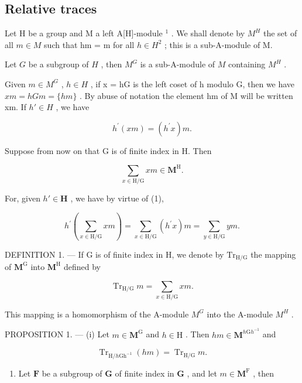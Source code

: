 \subsection{Relative traces}

Let H be a group and M a left A{[}H{]}-module \(^{1}\) . We shall denote by \(M^{H}\) the set of all \(m \in M\) such that hm = m for all \(h \in H^{2}\) ; this is a sub-A-module of M.

Let \(G\) be a subgroup of \(H\) , then \(M^G\) is a sub-A-module of \(M\) containing \(M^H\) .

Given \(m \in M^{G}\) , \(h \in H\) , if x = hG is the left coset of h modulo G, then we have \(xm = hGm = \{hm\}\) . By abuse of notation the element hm of M will be written xm. If \(h' \in H\) , we have

\[
h ^ {\prime} (x m) = \left(h ^ {\prime} x\right) m.\tag{1}
\]

Suppose from now on that G is of finite index in H. Then

\[
\sum_ {x \in \mathrm{H} / \mathrm{G}} x m \in \mathbf {M} ^ {\mathrm{H}}.\tag{2}
\]

For, given \(h' \in \mathbf{H}\) , we have by virtue of (1),

\[
h ^ {\prime} \left(\sum_ {x \in \mathrm{H} / \mathrm{G}} x m\right) = \sum_ {x \in \mathrm{H} / \mathrm{G}} \left(h ^ {\prime} x\right) m = \sum_ {y \in \mathrm{H} / \mathrm{G}} y m.
\]

DEFINITION 1. --- If G is of finite index in H, we denote by \(\mathrm{Tr}_{\mathrm{H}/\mathrm{G}}\) the mapping of \(\mathbf{M}^{\mathrm{G}}\) into \(\mathbf{M}^{\mathrm{H}}\) defined by

\[
\operatorname{Tr} _ {\mathrm{H} / \mathrm{G}} m = \sum_ {x \in \mathrm{H} / \mathrm{G}} x m.\tag{3}
\]

This mapping is a homomorphism of the A-module \(M^{G}\) into the A-module \(M^{H}\) .

PROPOSITION 1. --- (i) Let \(m \in \mathbf{M}^{\mathrm{G}}\) and \(h \in \mathrm{H}\) . Then \(hm \in \mathbf{M}^{h\mathrm{G}h^{-1}}\) and

\[
\operatorname{Tr} _ {\mathrm{H} / h \mathrm{Gh} ^ {- 1}} (h m) = \operatorname{Tr} _ {\mathrm{H} / \mathrm{G}} m.
\]

\begin{enumerate}
\def\labelenumi{(\roman{enumi})}
\setcounter{enumi}{1}
\tightlist
\item
  Let \(\mathbf{F}\) be a subgroup of \(\mathbf{G}\) of finite index in \(\mathbf{G}\) , and let \(m \in \mathbf{M}^{\mathrm{F}}\) , then
\end{enumerate}

